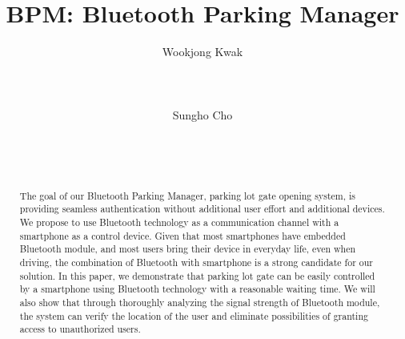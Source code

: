 \documentclass{sig-alternate-ipsn13}
\begin{document}
\title{BPM: Bluetooth Parking Manager}


\author{
\alignauthor
Wookjong Kwak\\
       \\
       \\
       \\
\alignauthor
Sungho Cho\\
       \\
       \\
       \\
}

\maketitle
\begin{abstract}

The goal of our Bluetooth Parking Manager, parking lot gate opening system, is providing seamless authentication without additional user effort and additional devices. We propose to use Bluetooth technology as a communication channel with a smartphone as a control device. Given that most smartphones have embedded Bluetooth module, and most users bring their device in everyday life, even when driving, the combination of Bluetooth with smartphone is a strong candidate for our solution. In this paper, we demonstrate that parking lot gate can be easily controlled by a smartphone using Bluetooth technology with a reasonable waiting time. We will also show that through thoroughly analyzing the signal strength of Bluetooth module, the system can verify the location of the user and eliminate possibilities of granting access to unauthorized users.

\end{abstract}










%

%
%


\end{document}
